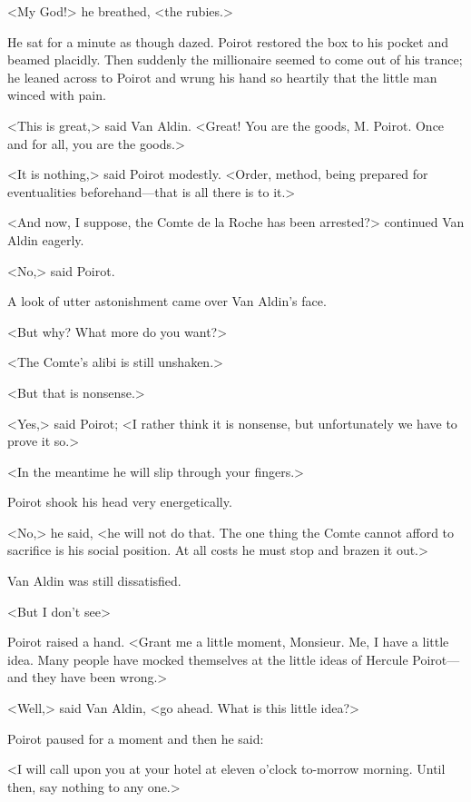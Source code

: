 <My God!> he breathed, <the rubies.>

He sat for a minute as though dazed. Poirot restored the box to his pocket and beamed placidly. Then suddenly the millionaire seemed to come out of his trance; he leaned across to Poirot and wrung his hand so heartily that the little man winced with pain.

<This is great,> said Van Aldin. <Great! You are the goods, M. Poirot. Once and for all, you are the goods.>

<It is nothing,> said Poirot modestly. <Order, method, being prepared for eventualities beforehand—that is all there is to it.>

<And now, I suppose, the Comte de la Roche has been arrested?> continued Van Aldin eagerly.

<No,> said Poirot.

A look of utter astonishment came over Van Aldin's face.

<But why? What more do you want?>

<The Comte's alibi is still unshaken.>

<But that is nonsense.>

<Yes,> said Poirot; <I rather think it is nonsense, but unfortunately we have to prove it so.>

<In the meantime he will slip through your fingers.>

Poirot shook his head very energetically.

<No,> he said, <he will not do that. The one thing the Comte cannot afford to sacrifice is his social position. At all costs he must stop and brazen it out.>

Van Aldin was still dissatisfied.

<But I don't see\longdash>

Poirot raised a hand. <Grant me a little moment, Monsieur. Me, I have a little idea. Many people have mocked themselves at the little ideas of Hercule Poirot—and they have been wrong.>

<Well,> said Van Aldin, <go ahead. What is this little idea?>

Poirot paused for a moment and then he said:

<I will call upon you at your hotel at eleven o'clock to-morrow morning. Until then, say nothing to any one.>